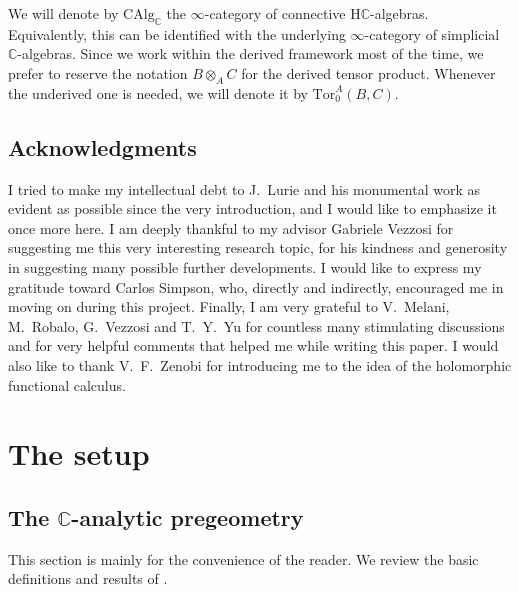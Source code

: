 \documentclass[12pt,a4paper,reqno]{amsart}
\theoremstyle{plain}
\theoremstyle{definition}
\theoremstyle{remark}
\numberwithin{equation}{section}
\begin{document}
We will denote by $\mathrm{CAlg}_{\mathbb C}$ the $\infty$-category of connective ${\mathrm H} \mathbb C$-algebras.
Equivalently, this can be identified with the underlying $\infty$-category of simplicial $\mathbb C$-algebras.
Since we work within the derived framework most of the time, we prefer to reserve the notation $B \otimes_A C$ for the derived tensor product. Whenever the underived one is needed, we will denote it by ${\mathrm{Tor}}^A_0(B, C)$.

\subsection*{Acknowledgments}

I tried to make my intellectual debt to J.\ Lurie and his monumental work as evident as possible since the very introduction, and I would like to emphasize it once more here.
I am deeply thankful to my advisor Gabriele Vezzosi for suggesting me this very interesting research topic, for his kindness and generosity in suggesting many possible further developments.
I would like to express my gratitude toward Carlos Simpson, who, directly and indirectly, encouraged me in moving on during this project.
Finally, I am very grateful to  V.\ Melani, M.\ Robalo, G.\ Vezzosi and T.\ Y.\ Yu for countless many stimulating discussions and for very helpful comments that helped me while writing this paper. I would also like to thank V.\ F.\ Zenobi for introducing me to the idea of the holomorphic functional calculus.

\section{The setup} \label{sec:setup}

\subsection{The {$\mathbb C$-analytic\xspace} pregeometry} \label{subsec:review}

This section is mainly for the convenience of the reader.
We review the basic definitions and results of \cite{DAG-IX}.
\end{document}
